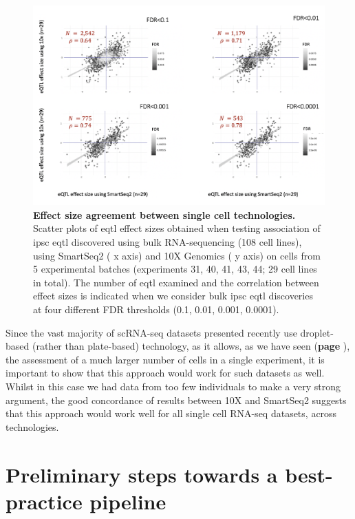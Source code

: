 \begin{figure}[h]
\centering
\includegraphics[width=15cm]{Chapter3/Fig/beta_comparison_ss2_vs_10x.png}
\caption[iPSC sc-eQTL replication across technologies]{\textbf{Effect size agreement between single cell technologies.}\\
Scatter plots of \gls{eqtl} effect sizes obtained when testing association of \gls{ipsc} \gls{eqtl} discovered using bulk RNA-sequencing (108 cell lines), using SmartSeq2 (\cite{picelli2013smart} x axis) and 10X Genomics (\cite{zheng2017massively} y axis) on cells from 5 experimental batches (experiments 31, 40, 41, 43, 44; 29 cell lines in total). 
The number of \gls{eqtl} examined and the correlation between effect sizes is indicated when we consider bulk \gls{ipsc} \gls{eqtl} discoveries at four different FDR thresholds (0.1, 0.01, 0.001, 0.0001).}
\label{fig:sc_eqtl_technologies}
\end{figure}

Since the vast majority of scRNA-seq datasets presented recently use droplet-based (rather than plate-based) technology, as it allows, as we have seen (\textbf{page \pageref{fig:scrnaseq_plate_vs_droplet}}), the assessment of a much larger number of cells in a single experiment, it is important to show that this approach would work for such datasets as well. 
Whilst in this case we had data from too few individuals to make a very strong argument, the good concordance of results between 10X and SmartSeq2 suggests that this approach would work well for all single cell RNA-seq datasets, across technologies.

\clearpage

\section{Preliminary steps towards a best-practice pipeline}
\label{sec:best_practice}

